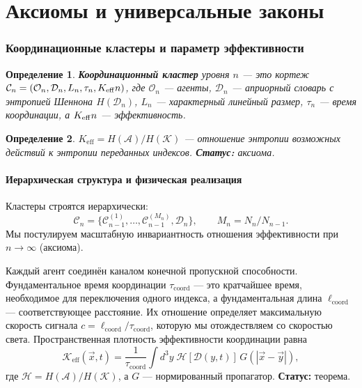 \documentclass[11pt,a4paper]{article}
\newtheorem{definition}{Определение}[section]
\newcommand{\Keff}[1][]{K_{\mathrm{eff}\if\relax\detokenize{#1}\relax\else,#1\fi}}
\newcommand{\coord}{\mathrm{coord}}
\newcommand{\Dir}{\mathcal{D}}
\newcommand{\cC}{\mathcal{C}}
\begin{document}
	\tableofcontents
	\newpage
	
	\part{Аксиомы и универсальные законы}
	
	\section{Координационные кластеры и параметр эффективности}
	\begin{definition}
		\textbf{Координационный кластер} уровня \(n\) — это кортеж \(\cC_n = (\mathcal{O}_n, \Dir_n, L_n, \tau_n, \Keff{n})\), где \(\mathcal{O}_n\) — агенты, \(\Dir_n\) — априорный словарь с энтропией Шеннона \(H(\Dir_n)\), \(L_n\) — характерный линейный размер, \(\tau_n\) — время координации, а \(\Keff{n}\) — эффективность.
	\end{definition}
	
	\begin{definition}
		\(K_{\mathrm{eff}} = H(\mathcal{A})/H(\mathcal{K})\) — отношение энтропии возможных действий к энтропии переданных индексов. \textbf{Статус:} аксиома.
	\end{definition}
	
	\subsection{Иерархическая структура и физическая реализация}
	Кластеры строятся иерархически:
	\[
	\cC_n = \{\cC_{n-1}^{(1)},\dots,\cC_{n-1}^{(M_n)},\Dir_n\}, \qquad M_n = N_n/N_{n-1}.
	\]
	Мы постулируем масштабную инвариантность отношения эффективности при \(n\to\infty\) (аксиома).
	
	Каждый агент соединён каналом конечной пропускной способности. Фундаментальное время координации \(\tau_{\coord}\) — это кратчайшее время, необходимое для переключения одного индекса, а фундаментальная длина \(\ell_{\coord}\) — соответствующее расстояние. Их отношение определяет максимальную скорость сигнала \(c = \ell_{\coord}/\tau_{\coord}\), которую мы отождествляем со скоростью света. Пространственная плотность эффективности координации равна
	\begin{equation}
		\mathcal{K}_{\mathrm{eff}}(\vec{x},t) = \frac{1}{\tau_{\coord}} \int d^3y\; \mathcal{H}[\Dir(y,t)]\, G(|\vec{x}-\vec{y}|),
		\label{eq:Kfield}
	\end{equation}
	где \(\mathcal{H} = H(\mathcal{A})/H(\mathcal{K})\), а \(G\) — нормированный пропагатор. \textbf{Статус:} теорема.
	
\end{document}
